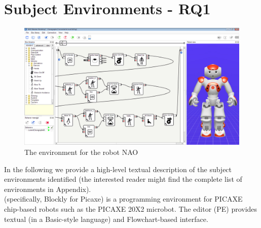 \section{Subject Environments - RQ1}\label{sec:environments}


 





\begin{figure}[t]
     \centering
    \includegraphics[width=\columnwidth]{fig/examples/choregraphe.jpg}
      \caption{The environment \choregraphe for the robot NAO}
      \label{fig:choregraphe}
   \end{figure}

In the following we provide a high-level textual description of the  subject environments identified (the interested reader might find the complete list of environments in Appendix).\\
\parhead{\picaxe} (specifically, Blockly for Picaxe) is a programming environment for PICAXE chip-based robots such as the PICAXE 20X2 microbot. The \picaxe editor (PE) provides textual (in a Basic-style language) and Flowchart-based interface.  %

